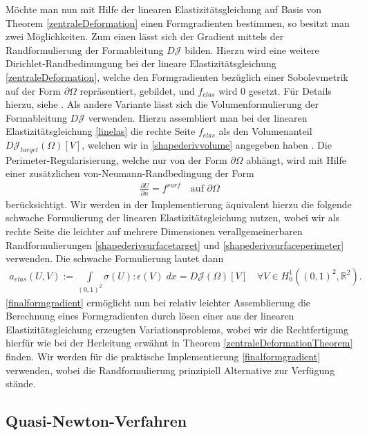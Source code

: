Möchte man nun mit Hilfe der linearen Elastizitätsgleichung auf Basis von Theorem \ref{zentraleDeformation} einen Formgradienten bestimmen, so besitzt man zwei Möglichkeiten. Zum einen lässt sich der Gradient mittels der Randformulierung der Formableitung $D\mathcal{J}$ bilden. Hierzu wird eine weitere Dirichlet-Randbedinungung bei der lineare Elastizitätsgleichung \ref{zentraleDeformation}, welche den Formgradienten bezüglich einer Sobolevmetrik auf der Form $\partial\Omega$ repräsentiert, gebildet, und $f_{elas}$ wird $0$ gesetzt. Für Details hierzu, siehe \cite{bfgs2}.
Als andere Variante lässt sich die Volumenformulierung der Formableitung $D\mathcal{J}$ verwenden. Hierzu assembliert man bei der linearen Elastizitätsgleichung \ref{linelas} die rechte Seite $f_{elas}$ als den Volumenanteil $D\mathcal{J}_{target}(\Omega)[V]$, welchen wir in \ref{shapederivvolume} angegeben haben . Die Perimeter-Regularisierung, welche nur von der Form $\partial\Omega$ abhängt, wird mit Hilfe einer zusätzlichen von-Neumann-Randbedingung der Form
\begin{align*}
	\frac{\partial U}{\partial n} = f^{surf} \quad \text{auf } \partial\Omega
\end{align*}
berücksichtigt. Wir werden in der Implementierung äquivalent hierzu die folgende schwache Formulierung der linearen Elastizitätsgleichung nutzen, wobei wir als rechte Seite die leichter auf mehrere Dimensionen verallgemeinerbaren Randformulierungen \ref{shapederivsurfacetarget} und \ref{shapederivsurfaceperimeter} verwenden. Die schwache Formulierung lautet dann
\begin{equation}\label{finalformgradient}
	\begin{aligned}
		a_{elas}(U,V) := \underset{(0,1)^2}{\int}\sigma(U):\epsilon(V) \;dx = D\mathcal{J}(\Omega)[V] \quad \forall V\in H^1_0((0,1)^2, \mathbb{R}^2).
	\end{aligned}
\end{equation}
\ref{finalformgradient} ermöglicht nun bei relativ leichter Assemblierung die Berechnung eines Formgradienten durch lösen einer aus der linearen Elastizitätsgleichung erzeugten Variationsproblems, wobei wir die Rechtfertigung hierfür wie bei der Herleitung erwähnt in Theorem \ref{zentraleDeformationTheorem} finden. Wir werden für die praktische Implementierung \ref{finalformgradient} verwenden, wobei die Randformulierung prinzipiell Alternative zur Verfügung stände. 

\subsection{Quasi-Newton-Verfahren}


